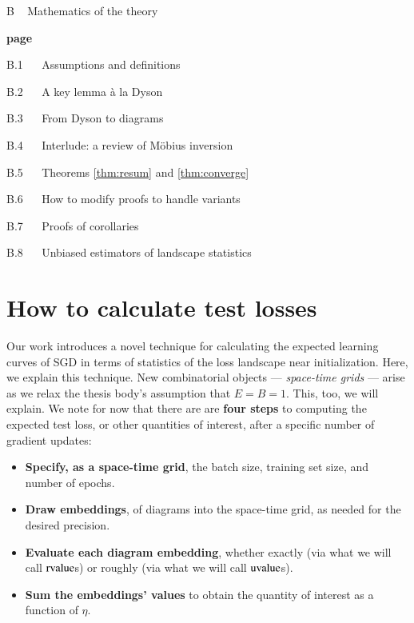 \documentclass[openany, notitlepage, justified]{tufte-book}
\theoremstyle{plain}
\theoremstyle{definition}
\newcommand{\uvalue}{\text{\textnormal{uvalue}}}
\newcommand{\rvalue}{\text{\textnormal{rvalue}}}
\begin{document}
    {\bf
    \par\noindent B ~ Mathematics of the theory}                            \hfill {\bf page \pageref{appendix:math}}
    \par\indent     B.1 ~~ Assumptions and definitions                      \hfill \pageref{appendix:assumptions}
    \par\indent     B.2 ~~ A key lemma \`a la Dyson                         \hfill \pageref{appendix:key-lemma}
    \par\indent     B.3 ~~ From Dyson to diagrams                           \hfill \pageref{appendix:toward-diagrams}
    \par\indent     B.4 ~~ Interlude: a review of M\"obius inversion        \hfill \pageref{appendix:mobius}
    \par\indent     B.5 ~~ Theorems \ref{thm:resum} and \ref{thm:converge}  \hfill \pageref{appendix:resum}
    \par\indent     B.6 ~~ How to modify proofs to handle variants          \hfill \pageref{appendix:prove-variants}
    \par\indent     B.7 ~~ Proofs of corollaries                            \hfill \pageref{appendix:corollaries}
    \par\indent     B.8 ~~ Unbiased estimators of landscape statistics      \hfill \pageref{appendix:bessel}

\renewcommand{\thechapter}{\Alph{chapter}}


\chapter{How to calculate test losses}                   \label{appendix:tutorial}
    Our work introduces a novel technique for calculating the expected learning
    curves of SGD in terms of statistics of the loss landscape near
    initialization.  Here, we explain this technique.  New combinatorial
    objects --- \emph{space-time grids} --- arise as we relax the thesis body's
    assumption that $E=B=1$.  This, too, we will explain.  We note for now that
    there are are {\bf four steps} to computing the expected test loss, or
    other quantities of interest, after a specific number of gradient updates: 
    \begin{itemize}
        \item {\bf Specify, as a space-time grid}, the batch size, training set
            size, and number of epochs. 
        \item {\bf Draw embeddings}, of diagrams into the
            space-time grid, as needed for the desired precision.
        \item {\bf Evaluate each diagram embedding}, whether exactly (via what
            we will call $\rvalue$s) or roughly (via what we will call
            $\uvalue$s).
        \item {\bf Sum the embeddings' values} to obtain the quantity of
              interest as a function of $\eta$.
    \end{itemize}
\end{document}
